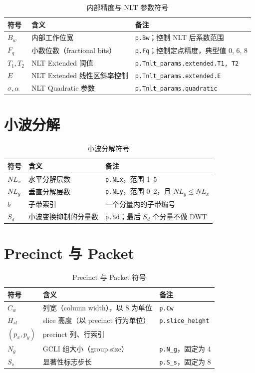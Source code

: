 \begin{table}[H]
\centering
\caption{内部精度与 NLT 参数符号}
\label{tab:notation-nlt}
\begin{tabular}{@{}lll@{}}
\toprule
符号 & 含义 & 备注 \\
\midrule
$B_w$ & 内部工作位宽 & \texttt{p.Bw}；控制 NLT 后系数范围 \\
$F_q$ & 小数位数（fractional bits） & \texttt{p.Fq}；控制定点精度，典型值 0, 6, 8 \\
$T_1, T_2$ & NLT Extended 阈值 & \texttt{p.Tnlt\_params.extended.T1, T2} \\
$E$ & NLT Extended 线性区斜率控制 & \texttt{p.Tnlt\_params.extended.E} \\
$\sigma, \alpha$ & NLT Quadratic 参数 & \texttt{p.Tnlt\_params.quadratic} \\
\bottomrule
\end{tabular}
\end{table}

\section{小波分解}

\begin{table}[H]
\centering
\caption{小波分解符号}
\label{tab:notation-dwt}
\begin{tabular}{@{}lll@{}}
\toprule
符号 & 含义 & 备注 \\
\midrule
$NL_x$ & 水平分解层数 & \texttt{p.NLx}，范围 1--5 \\
$NL_y$ & 垂直分解层数 & \texttt{p.NLy}，范围 0--2，且 $NL_y \leq NL_x$ \\
$b$ & 子带索引 & 一个分量内的子带编号 \\
$S_d$ & 小波变换抑制的分量数 & \texttt{p.Sd}；最后 $S_d$ 个分量不做 DWT \\
\bottomrule
\end{tabular}
\end{table}

\section{Precinct 与 Packet}

\begin{table}[H]
\centering
\caption{Precinct 与 Packet 符号}
\label{tab:notation-precinct}
\begin{tabular}{@{}lll@{}}
\toprule
符号 & 含义 & 备注 \\
\midrule
$C_w$ & 列宽（column width），以 8 为单位 & \texttt{p.Cw} \\
$H_{sl}$ & slice 高度（以 precinct 行为单位） & \texttt{p.slice\_height} \\
$(p_x, p_y)$ & precinct 列、行索引 & \\
$N_g$ & GCLI 组大小（group size） & \texttt{p.N\_g}，固定为 4 \\
$S_s$ & 显著性标志步长 & \texttt{p.S\_s}，固定为 8 \\
\bottomrule
\end{tabular}
\end{table}

